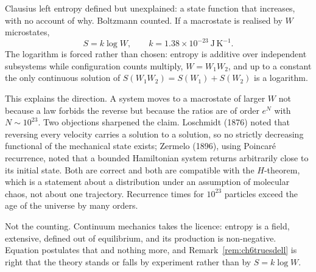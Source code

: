 {\begin{readernote}
Clausius left entropy defined but unexplained: a state function that
increases, with no account of why. Boltzmann counted. If a macrostate is
realised by $W$ microstates,
\[
   \boxed{\ S=k\log W ,\qquad
   k=1.38\times10^{-23}\ \mathrm{J\,K^{-1}} .\ }
\]
The logarithm is forced rather than chosen: entropy is additive over
independent subsystems while configuration counts multiply,
$W=W_{1}W_{2}$, and up to a constant the only continuous solution of
$S(W_{1}W_{2})=S(W_{1})+S(W_{2})$ is a logarithm.

This explains the direction. A system moves to a macrostate of larger
$W$ not because a law forbids the reverse but because the ratios are of
order $e^{N}$ with $N\sim10^{23}$. Two objections sharpened the claim.
Loschmidt (1876) noted that reversing every velocity carries a solution
to a solution, so no strictly decreasing functional of the mechanical
state exists; Zermelo (1896), using Poincar\'e recurrence, noted that a
bounded Hamiltonian system returns arbitrarily close to its initial
state. Both are correct and both are compatible with the
$H$-theorem, which is a statement about a distribution under an
assumption of molecular chaos, not about one trajectory. Recurrence
times for $10^{23}$ particles exceed the age of the universe by many
orders.

Not the counting. Continuum mechanics takes the licence: entropy is a
field, extensive, defined out of equilibrium, and its production is
non-negative. Equation  postulates that and nothing more, and
Remark~\ref{rem:ch6truesdell} is right that the theory stands or falls
by experiment rather than by $S=k\log W$.
\end{readernote}%
}

